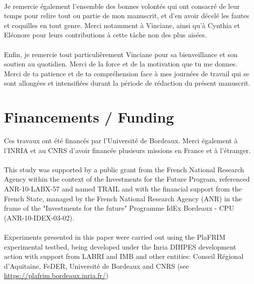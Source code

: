 \paragraph{}
Je remercie également l'ensemble des bonnes volontés qui ont consacré de leur temps pour relire tout ou partie de mon manuscrit, et d'en avoir décelé les fautes et coquilles en tout genre. 
Merci notamment à Vinciane, ainsi qu'à Cynthia et Eléonore pour leurs contributions à cette tâche non des plus aisées.

\paragraph{}
Enfin, je remercie tout particulièrement Vinciane pour sa bienveillance et son soutien au quotidien. 
Merci de la force et de la motivation que tu me donnes. 
Merci de ta patience et de ta compréhension face à mes journées de travail qui se sont allongées et intensifiées durant la période de rédaction du présent manuscrit. 

\vfill
\myhrule
\vspace*{5mm}
\section*{\large Financements / Funding}
Ces travaux ont été financés par l'Université de Bordeaux. 
Merci également à l'INRIA et au CNRS d'avoir financée plusieurs missions en France et à l'étranger.


\paragraph{}
This study was supported by a public grant from the French National Research
Agency within the context of the Investments for the Future Program, referenced ANR-10-LABX-57 and named TRAIL
and with the financial support from the French State, managed by the French National Research Agency (ANR) in the frame of the "Investments for the future" Programme IdEx Bordeaux - CPU (ANR-10-IDEX-03-02).


\paragraph{}
Experiments presented in this paper were carried out using the PlaFRIM experimental testbed,
being developed under the Inria DIHPES development action with support from LABRI and
IMB and other entities: Conseil Régional d’Aquitaine, FeDER, Université de Bordeaux and
CNRS (see \url{https://plafrim.bordeaux.inria.fr/})
